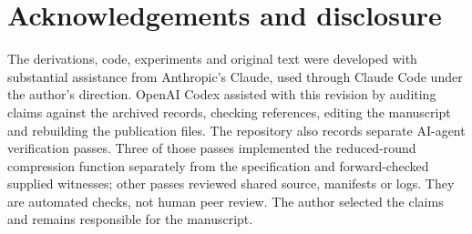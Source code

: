 \documentclass[11pt,a4paper]{article}
\begin{document}
\section*{Acknowledgements and disclosure}
The derivations, code, experiments and original text were developed with
substantial assistance from Anthropic's Claude, used through Claude Code under
the author's direction.  OpenAI Codex assisted with this revision by auditing
claims against the archived records, checking references, editing the
manuscript and rebuilding the publication files.  The repository also records
separate AI-agent verification passes.  Three of those passes implemented the
reduced-round compression function separately from the specification and
forward-checked supplied witnesses; other passes reviewed shared source,
manifests or logs.  They are automated checks, not human peer review.  The
author selected the claims and remains responsible for the manuscript.
\end{document}
